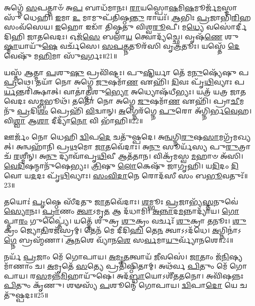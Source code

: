 𑌅𑌗𑍍𑌨𑍇᳴ \ul{𑌸}\-𑌪𑌤𑍍𑌨𑌾𑍞᳴ 𑌅\-\ul{𑌪} 𑌬𑌾𑌧᳴𑌮𑌾𑌨𑌃।
\-\ul{𑌰𑌾}\-𑌯𑌸𑍍𑌪𑍋\-\ul{𑌷}\-𑌮𑌿\-\ul{𑌷}\-𑌮𑍂𑌰𑍍𑌜᳴\-\ul{𑌮}\-𑌸𑍍𑌮𑌾𑌸𑍁᳴ 𑌧𑍇𑌹𑌿।
\-\ul{𑌇}\-𑌮𑌾 \ul{𑌉} 𑌮𑌾𑌮𑍁𑌪᳴𑌤𑌿𑌷𑍍𑌠\-\ul{𑌨𑍍𑌤𑍁} 𑌰𑌾𑌯𑌃᳴।
\-\ul{𑌆}\-𑌭𑌿𑌃 \ul{𑌪𑍍𑌰}\-𑌜𑌾𑌭𑌿᳴\-\ul{𑌰𑌿}\-𑌹 𑌸𑌂𑌵᳴𑌸𑍇𑌯।
\-\ul{𑌇}\-𑌹𑍋 𑌇𑌡𑌾᳴ 𑌤𑌿𑌷𑍍𑌠𑌤𑍁 𑌵𑌿𑌶𑍍𑌵\-\ul{𑌰𑍂}\-𑌪𑍀।
𑌮\-\ul{𑌧𑍍𑌯𑍇} 𑌵𑌸𑍋॑𑌰𑍍𑌦𑍀𑌦𑌿𑌹𑌿 𑌜𑌾𑌤𑌵𑍇𑌦𑌃।
𑌓𑌜᳴\-\ul{𑌸𑍇} 𑌬𑌲𑌾᳴\-\ul{𑌯} 𑌤𑍍𑌵𑍋𑌦𑍍𑌯᳴𑌚𑍍𑌛𑍇।
𑌵𑍃𑌷᳴\-\ul{𑌣𑍇} 𑌶𑍁\-\ul{𑌷𑍍𑌮𑌾}\-𑌯𑌾𑌯𑍁᳴\-\ul{𑌷𑍇} 𑌵𑌰𑍍𑌚᳴𑌸𑍇।
\-\ul{𑌸}\-\-\ul{𑌪}\-\-\ul{𑌤𑍍𑌨}\-𑌤𑍂𑌰᳴𑌸𑌿 𑌵𑍃\-\ul{𑌤𑍍𑌰}\-𑌤𑍂𑌃।
𑌯𑌸𑍍𑌤𑍇᳴ \ul{𑌦𑍇}\-𑌵𑍇𑌷𑍁᳴ 𑌮\-\ul{𑌹𑌿}\-𑌮𑌾 𑌸𑍁᳴\-\ul{𑌵}\-𑌰𑍍𑌗𑌃॥21॥

𑌯𑌸𑍍𑌤᳴ \ul{𑌆}\-𑌤𑍍𑌮𑌾 \ul{𑌪}\-𑌶𑍁\-\ul{𑌷𑍁} 𑌪𑍍𑌰𑌵𑌿᳴𑌷𑍍𑌟𑌃।
𑌪𑍁\-\ul{𑌷𑍍𑌟𑌿}\-𑌰𑍍𑌯𑌾 𑌤𑍇᳴ 𑌮\-\ul{𑌨𑍁}\-𑌷𑍍𑌯𑍇᳴𑌷𑍁 𑌪\-\ul{𑌪𑍍𑌰}\-𑌥𑍇।
𑌤𑌯𑌾᳴ 𑌨𑍋 𑌅𑌗𑍍𑌨𑍇 \ul{𑌜𑍁}\-𑌷𑌮𑌾᳴\-\ul{𑌣} 𑌏𑌹𑌿᳴।
\-\ul{𑌦𑌿}\-𑌵𑌃 𑌪𑍃᳴\-\ul{𑌥𑌿}\-𑌵𑍍𑌯𑌾𑌃 𑌪\-\ul{𑌰𑍍𑌯}\-𑌨𑍍𑌤𑌰𑌿᳴𑌕𑍍𑌷𑌾𑌤𑍍।
𑌵𑌾𑌤𑌾॑\-\ul{𑌤𑍍𑌪}\-𑌶𑍁\-\ul{𑌭𑍍𑌯𑍋} 𑌅𑌧𑍍𑌯𑍋𑌷᳴𑌧𑍀𑌭𑍍𑌯𑌃।
𑌯𑌤𑍍𑌰᳴ 𑌯𑌤𑍍𑌰 𑌜𑌾𑌤𑌵𑍇𑌦𑌃 𑌸\-\ul{𑌮𑍍𑌬}\-𑌭𑍂𑌥᳴।
𑌤𑌤𑍋᳴ 𑌨𑍋 𑌅𑌗𑍍𑌨𑍇 \ul{𑌜𑍁}\-𑌷𑌮𑌾᳴\-\ul{𑌣} 𑌏𑌹𑌿᳴।
𑌪𑍍𑌰𑌾\-\ul{𑌚𑍀}\-𑌮𑌨𑍁᳴ \ul{𑌪𑍍𑌰}\-𑌦𑌿\-\ul{𑌶𑌂} 𑌪𑍍𑌰𑍇𑌹𑌿᳴ \ul{𑌵𑌿}\-𑌦𑍍𑌵𑌾𑌨𑍍।
\-\ul{𑌅}\-𑌗𑍍𑌨𑍇𑌰᳴𑌗𑍍𑌨𑍇 \ul{𑌪𑍁}\-𑌰𑍋 𑌅᳴𑌗𑍍𑌨𑌿𑌰𑍍𑌭\-\ul{𑌵𑍇}\-𑌹।
𑌵𑌿\-\ul{𑌶𑍍𑌵𑌾} 𑌆\-\ul{𑌶𑌾} 𑌦𑍀𑌦𑍍𑌯𑌾᳴\-\ul{𑌨𑍋} 𑌵𑌿 𑌭𑌾᳴𑌹𑌿॥22॥

𑌊𑌰𑍍𑌜𑌂᳴ 𑌨𑍋 𑌧𑍇𑌹𑌿 \ul{𑌦𑍍𑌵𑌿}\-𑌪\-\ul{𑌦𑍇} 𑌚𑌤𑍁᳴𑌷𑍍𑌪𑌦𑍇।
𑌅\-\ul{𑌨𑍍𑌵}\-𑌗𑍍𑌨𑌿\-\ul{𑌰𑍁}\-𑌷\-\ul{𑌸𑌾}\-𑌮𑌗𑍍𑌰᳴𑌮𑌖𑍍𑌯𑌤𑍍।
𑌅𑌨𑍍𑌵𑌹𑌾᳴𑌨𑌿 𑌪𑍍𑌰\-\ul{𑌥}\-𑌮𑍋 \ul{𑌜𑌾}\-𑌤𑌵𑍇᳴𑌦𑌾𑌃।
𑌅\-\ul{𑌨𑍁} 𑌸𑍂𑌰𑍍𑌯᳴𑌸𑍍𑌯 𑌪𑍁\-\ul{𑌰𑍁}\-𑌤𑍍𑌰𑌾 𑌚᳴ \ul{𑌰}\-𑌶𑍍𑌮𑍀𑌨𑍍।
𑌅\-\ul{𑌨𑍁} 𑌦𑍍𑌯𑌾𑌵𑌾᳴𑌪𑍃\-\ul{𑌥𑌿}\-𑌵𑍀 𑌆𑌤᳴𑌤𑌾𑌨।
𑌵𑌿𑌕𑍍𑌰᳴𑌮𑌸𑍍𑌵 \ul{𑌮}\-𑌹𑌾𑍞 𑌅᳴𑌸𑌿।
\-\ul{𑌵𑍇}\-\-\ul{𑌦𑌿}\-𑌷𑌨𑍍𑌮𑌾𑌨𑍁᳴𑌷𑍇𑌭𑍍𑌯𑌃।
\-\ul{𑌤𑍍𑌰𑌿}\-𑌷𑍁 \ul{𑌲𑍋}\-𑌕𑍇𑌷𑍁᳴ 𑌜𑌾𑌗𑍃𑌹𑌿।
𑌯\-\ul{𑌦𑌿}\-𑌦𑌂 \ul{𑌦𑌿}\-𑌵𑍋 𑌯\-\ul{𑌦}\-𑌦𑌃 𑌪𑍃᳴\-\ul{𑌥𑌿}\-𑌵𑍍𑌯𑌾𑌃।
\-\ul{𑌸𑌂}\-\-\ul{𑌵𑌿}\-\-\ul{𑌦𑌾}\-𑌨𑍇 𑌰𑍋𑌦᳴𑌸𑍀 𑌸𑌂 𑌬\-\ul{𑌭𑍂}\-𑌵𑌤𑍁𑌃᳴॥23॥

𑌤𑌯𑍋𑌃॑ \ul{𑌪𑍃}\-𑌷𑍍𑌠𑍇 𑌸𑍀᳴𑌦𑌤𑍁 \ul{𑌜𑌾}\-𑌤𑌵𑍇᳴𑌦𑌾𑌃।
\-\ul{𑌶}\-𑌮𑍍𑌭𑍂𑌃 \ul{𑌪𑍍𑌰}\-𑌜𑌾𑌭𑍍𑌯᳴\-\ul{𑌸𑍍𑌤}\-𑌨𑍁𑌵𑍇॑ \ul{𑌸𑍍𑌯𑍋}\-𑌨𑌃।
\-\ul{𑌪𑍍𑌰𑌾}\-𑌣𑌂 \ul{𑌤𑍍𑌵𑌾}\-\-𑌽𑌮𑍃\-\ul{𑌤} 𑌆 𑌦᳴𑌧𑌾𑌮𑌿।
\-\ul{𑌅}\-\-\ul{𑌨𑍍𑌨𑌾}\-𑌦\-\ul{𑌮}\-𑌨𑍍𑌨𑌾𑌦𑍍𑌯𑌾᳴𑌯।
\-\ul{𑌗𑍋}\-𑌪𑍍𑌤𑌾\-\ul{𑌰𑌂} 𑌗𑍁𑌪𑍍𑌤𑍍𑌯𑍈॑।
𑌯𑌤𑍍𑌤𑍇᳴ 𑌶𑍁𑌕𑍍𑌰 \ul{𑌶𑍁}\-𑌕𑍍𑌰𑌂 𑌵𑌰𑍍𑌚𑌃᳴ \ul{𑌶𑍁}\-𑌕𑍍𑌰𑌾 \ul{𑌤}\-𑌨𑍂𑌃।
\-\ul{𑌶𑍁}\-𑌕𑍍𑌰𑌂 𑌜𑍍𑌯𑍋\-\ul{𑌤𑌿}\-𑌰𑌜᳴𑌸𑍍𑌰𑌮𑍍।
𑌤𑍇𑌨᳴ 𑌮𑍇 𑌦𑍀𑌦𑌿\-\ul{𑌹𑌿} 𑌤𑍇\-\ul{𑌨} 𑌤𑍍𑌵𑌾𑌽𑌽𑌦᳴𑌧𑍇।
\-\ul{𑌅}\-𑌗𑍍𑌨𑌿𑌨𑌾॑\-𑌽\-\ul{𑌗𑍍𑌨𑍇} 𑌬𑍍𑌰𑌹𑍍𑌮᳴𑌣𑌾।
\-\ul{𑌆}\-\-\ul{𑌨}\-𑌶𑍇 𑌵𑍍𑌯𑌾᳴𑌨\-\ul{𑌶𑍇} 𑌸\-\ul{𑌰𑍍𑌵}\-𑌮𑌾\-\ul{𑌯𑍁}\-𑌰𑍍𑌵𑍍𑌯𑌾᳴𑌨𑌶𑍇॥24॥

𑌨𑌰𑍍𑌯᳴ \ul{𑌪𑍍𑌰}\-𑌜𑌾𑌂 𑌮𑍇᳴ 𑌗𑍋𑌪𑌾𑌯।
\-\ul{𑌅}\-\-\ul{𑌮𑍃}\-\-\ul{𑌤}\-𑌤𑍍𑌵𑌾𑌯᳴ \ul{𑌜𑍀}\-𑌵𑌸𑍇॑।
\-\ul{𑌜𑌾}\-𑌤𑌾𑌂 𑌜᳴\-\ul{𑌨𑌿}\-𑌷𑍍𑌯𑌮𑌾᳴𑌣𑌾𑌂 𑌚।
\-\ul{𑌅}\-𑌮𑍃𑌤𑍇᳴ \ul{𑌸}\-𑌤𑍍𑌯𑍇 𑌪𑍍𑌰𑌤𑌿᳴\-𑌷𑍍𑌠𑌿𑌤𑌾𑌮𑍍।
𑌅𑌥᳴𑌰𑍍𑌵 \ul{𑌪𑌿}\-𑌤𑍁𑌂 𑌮𑍇᳴ 𑌗𑍋𑌪𑌾𑌯।
𑌰\-\ul{𑌸}\-𑌮𑌨𑍍𑌨᳴\-\ul{𑌮𑌿}\-𑌹𑌾𑌯𑍁᳴𑌷𑍇।
𑌅𑌦᳴\-\ul{𑌬𑍍𑌧𑌾}\-𑌯𑍋\-𑌽𑌶𑍀᳴𑌤𑌤𑌨𑍋।
𑌅𑌵𑌿᳴𑌷𑌨𑍍𑌨𑌃 \ul{𑌪𑌿}\-𑌤𑍁𑌂 𑌕𑍃᳴𑌣𑍁।
𑌶𑍟𑌸𑍍𑌯᳴ \ul{𑌪}\-𑌶𑍂𑌨𑍍𑌮𑍇᳴ 𑌗𑍋𑌪𑌾𑌯।
\-\ul{𑌦𑍍𑌵𑌿}\-𑌪𑌾\-\ul{𑌦𑍋} 𑌯𑍇 𑌚𑌤𑍁᳴𑌷𑍍𑌪𑌦𑌃॥25॥

